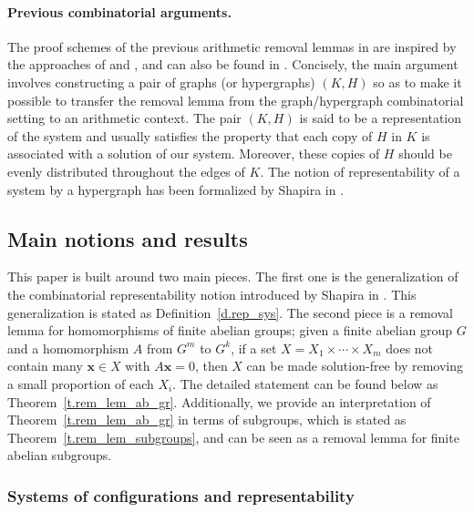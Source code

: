 \documentclass[10pt]{article}
\begin{document}
\paragraph{Previous combinatorial arguments.} 
The proof schemes of the previous arithmetic removal lemmas in \cite{kraserven09,kraserven12,ksv13,sha10} are inspired by the approaches of \cite{ruzsze78} and \cite{frarod02}, and can also be found in \cite{gow07,sol04,sze10,tao12}. Concisely, the main argument involves 
constructing a
 pair of graphs (or hypergraphs) $(K,H)$ so as to make it possible 
to transfer the removal lemma from the graph/hypergraph combinatorial setting to an arithmetic context. The pair $(K,H)$ is said to be a representation of the system and usually satisfies 
 the property that each copy of $H$ in $K$ is associated with a solution of our system. Moreover, these copies of $H$
should be evenly distributed throughout the edges of $K$.
The notion of representability of a  system by a hypergraph has been formalized by Shapira in \cite[Definition~2.4]{sha10}.







\subsection{Main notions and results} \label{s.main_notion_and_results}

This paper is built around two main pieces. The first one is the generalization of the combinatorial representability notion introduced by Shapira in \cite{sha10}. This generalization is stated as Definition~\ref{d.rep_sys}. The second piece is a removal lemma for homomorphisms of finite abelian groups; given a finite abelian group $G$ and a homomorphism $A$ from $G^m$ to $G^k$, if a set $X=X_1\times\cdots\times X_m$ does not contain many $\mathbf{x}\in X$ with $A\mathbf{x}=0$, then $X$ can be made solution-free by removing a small proportion of each $X_i$. The detailed statement can be found below as Theorem~\ref{t.rem_lem_ab_gr}. Additionally, we provide an interpretation of Theorem~\ref{t.rem_lem_ab_gr} in terms of subgroups, which is stated as Theorem~\ref{t.rem_lem_subgroups}, and can be seen as a removal lemma for finite abelian subgroups.


\subsubsection{Systems of configurations and representability}
\end{document}
